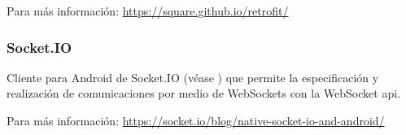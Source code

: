 Para más información: \href{https://square.github.io/retrofit/}{https://square.github.io/retrofit/}

\subsubsection{Socket.IO}
\label{lib:app:socketio}

Cliente para Android de Socket.IO (véase ) que permite la especificación y realización de comunicaciones por medio de WebSockets con la WebSocket \acrshort{api}.

Para más información: \href{https://socket.io/blog/native-socket-io-and-android/}{https://socket.io/blog/native-socket-io-and-android/}